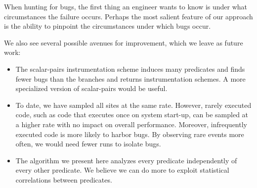 \documentclass[10pt]{acmconfbig}
\begin{document}
When hunting for bugs, the first thing an engineer wants to know is
under what circumstances the failure occurs.  Perhaps the most salient
feature of our approach is the ability to pinpoint the circumstances
under which bugs occur.

We also see several possible avenues for improvement, which we leave
as future work:
\begin{itemize}

\item The scalar-pairs instrumentation scheme induces many
predicates and finds fewer bugs than the branches and
returns instrumentation schemes.  A more specialized version of scalar-pairs
would be useful.

\item To date, we have sampled all sites at the same rate.  However,
rarely executed code, such as code that executes once on system start-up,
can be sampled at a higher rate with no impact on overall performance.
Moreover, infrequently executed code is more likely
to harbor bugs.  By observing rare events more often, we would need fewer
runs to isolate bugs.

\item The algorithm we present here analyzes every predicate independently
of every other predicate.  We believe we can do more to exploit
statistical correlations between predicates.


\end{itemize}



\end{document}
